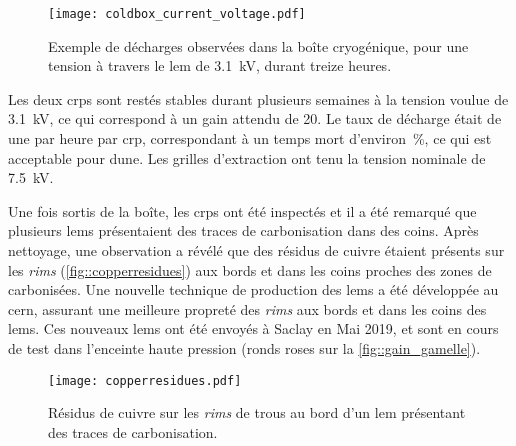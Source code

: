       \begin{figure}[!htb]
        \centering
        \texttt{[image: coldbox\_current\_voltage.pdf]}
        \caption[Décharges observées dans la boîte cryogénique]{\label{fig::coldbox_current_voltage}Exemple de décharges observées dans la boîte cryogénique, pour une tension à travers le \gls{lem} de \SI{3.1}{\kilo\volt}, durant treize heures.}
      \end{figure}
    
      Les deux \glspl{crp} sont restés stables durant plusieurs semaines à la tension voulue de \SI{3.1}{\kilo\volt}, ce qui correspond à un gain attendu de 20. Le taux de décharge était de une par heure par \gls{crp}, correspondant à un temps mort d'environ \,\%, ce qui est acceptable pour \gls{dune}. Les grilles d'extraction ont tenu la tension nominale de \SI{7.5}{\kilo\volt}. 

      Une fois sortis de la boîte, les \glspl{crp} ont été inspectés et il a été remarqué que plusieurs \glspl{lem} présentaient des traces de carbonisation dans des coins. Après nettoyage, une observation a révélé que des résidus de cuivre étaient présents sur les \textit{rims} (\autoref{fig::copperresidues}) aux bords et dans les coins proches des zones de carbonisées. Une nouvelle technique de production des \glspl{lem} a été développée au \gls{cern}, assurant une meilleure propreté des \textit{rims} aux bords et dans les coins des \glspl{lem}. Ces nouveaux \glspl{lem} ont été envoyés à Saclay en Mai 2019, et sont en cours de test dans l'enceinte haute pression (ronds roses sur la \autoref{fig::gain_gamelle}).

      \begin{figure}
        \centering
        \texttt{[image: copperresidues.pdf]}
        \caption[Résidus de cuivre sur certains \textit{rims}]{\label{fig::copperresidues}Résidus de cuivre sur les \textit{rims} de trous au bord d'un \gls{lem} présentant des traces de carbonisation.}
      \end{figure}
        
